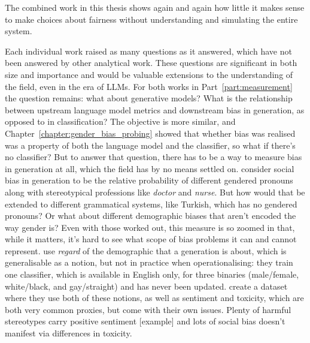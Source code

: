 The combined work in this thesis shows again and again how little it makes sense to make choices about fairness without understanding and simulating the entire system. 

Each individual work raised as many questions as it answered, which have not been answered by other analytical work. These questions are significant in both size and importance and would be valuable extensions to the understanding of the field, even in the era of LLMs. For both works in Part~\ref{part:measurement} the question remains: what about generative models?  What is the relationship between upstream language model metrics and downstream bias in generation, as opposed to in classification? The objective is more similar, and Chapter~\ref{chapter:gender_bias_probing} showed that whether bias was realised was a property of both the language model and the classifier, so what if there's no classifier? 
But to answer that question, there has to be a way to measure bias in generation at all, which the field has by no means settled on. \citet{vig_causal} consider social bias in generation to be the relative probability of different gendered pronouns along with stereotypical professions like \textit{doctor} and \textit{nurse}. But how would that be extended to different grammatical systems, like Turkish, which has no gendered pronouns? Or what about different demographic biases that aren't encoded the way gender is? Even with those worked out, this measure is so zoomed in that, while it matters, it's hard to see what scope of bias problems it can and cannot represent. \citep{sheng-etal-2019} use \textit{regard} of the demographic that a generation is about, which is generalisable as a notion, but not in practice when operationalising: they train one classifier, which is available in English only, for three binaries (male/female, white/black, and gay/straight) and has never been updated. \citet{BOLD} create a dataset where they use both of these notions, as well as sentiment and toxicity, which are both very common proxies, but come with their own issues. Plenty of harmful stereotypes carry positive sentiment [example] and lots of social bias doesn't manifest via differences in toxicity. 
